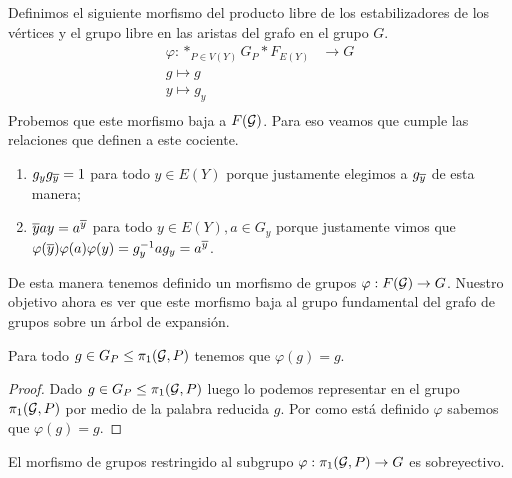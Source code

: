 \documentclass[tesis.tex]{subfiles}
\begin{document}
Definimos el siguiente morfismo del producto libre de los estabilizadores de los vértices y el grupo libre en las aristas del grafo en el grupo $G$.
\begin{align*}
	\varphi: \ast_{P \in V(Y)} G_P \ast F_{E(Y)} &\to G	\\
	g \mapsto g \\
	y \mapsto g_y \\
\end{align*}
Probemos que este morfismo baja a $F({\cal G})$. 
Para eso veamos que cumple las relaciones que definen a este cociente.
\begin{enumerate}
	\item $g_y g_{\overline y} = 1$ para todo $y \in E(Y)$ porque justamente elegimos a $g_{\overline y}$ de esta manera;
	\item $\overline y a y = a^{\overline y}$ para todo $y \in E(Y), a \in G_y$ porque justamente vimos que $\varphi(\overline y) \varphi (a) \varphi(y) = g_y^{-1}ag_y = a^{\overline y}$.
\end{enumerate}

De esta manera tenemos definido un morfismo de grupos $\varphi: F({\cal G}) \to G$.
Nuestro objetivo ahora es ver que este morfismo baja al grupo fundamental del grafo de grupos sobre un árbol de expansión.


\begin{lema}\label{lema_morfismo_pi1_inyectivo}
	Para todo $g \in G_P \le \pi_1({\cal G}, P)$ tenemos que $\varphi(g)=g$.
\end{lema}

\begin{proof}
	Dado $g \in G_P \le \pi_1({\cal G}, P)$ luego lo podemos representar en el grupo $\pi_1({\cal G}, P)$ por medio de la palabra reducida $g$.
	Por como está definido $\varphi$ sabemos que $\varphi(g) = g$. 
\end{proof}

\begin{prop}\label{prop_morf_grp_restr_sobre}
	El morfismo de grupos restringido al subgrupo $\varphi: \pi_1({\cal G}, P) \to G$ es sobreyectivo.
\end{prop}
\end{document}
